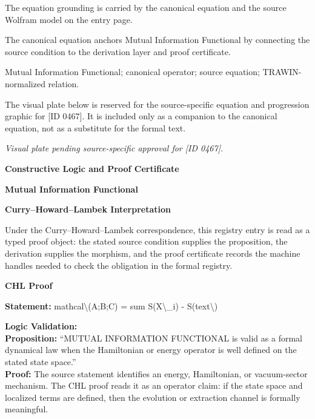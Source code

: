 The equation grounding is carried by the canonical equation and the source Wolfram model on the entry page.

The canonical equation anchors Mutual Information Functional by connecting the source condition to the derivation layer and proof certificate.

Mutual Information Functional; canonical operator; source equation; TRAWIN-normalized relation.
\endgroup

\begingroup\footnotesize\sloppy
The visual plate below is reserved for the source-specific equation and progression graphic for [ID 0467]. It is included only as a companion to the canonical equation, not as a substitute for the formal text.
\par\endgroup
\begingroup\footnotesize\itshape
Visual plate pending source-specific approval for [ID 0467].
\par\endgroup

\clearpage
\begingroup\tzpsupportsetup
\noindent\textbf{\fontsize{10.8pt}{12.8pt}\selectfont [ID 0467] Constructive Logic and Proof Certificate}\par
\noindent\textbf{\fontsize{10pt}{12pt}\selectfont Mutual Information Functional}\par
\vspace{0.45em}
\begingroup
\footnotesize
\setlength{\parskip}{0.22em}
\setlength{\parindent}{0pt}
\noindent\textbf{Curry--Howard--Lambek Interpretation}\par
Under the Curry--Howard--Lambek correspondence, this registry entry is read as a typed proof
object: the stated source condition supplies the proposition, the derivation supplies the
morphism, and the proof certificate records the machine handles needed to check the obligation
in the formal registry.

\vspace{0.45em}
\noindent\textbf{CHL Proof}\par
\textbf{Statement:} mathcal\textbackslash{}(A;B;C) = sum S(X\textbackslash{}\_i) - S(text\textbackslash{})

\textbf{Logic Validation:}\\
\textbf{Proposition:} ``MUTUAL INFORMATION FUNCTIONAL is valid as a formal dynamical law when the Hamiltonian or
energy operator is well defined on the stated state space.''\\
\textbf{Proof:} The source statement identifies an energy, Hamiltonian, or vacuum-sector mechanism. The
CHL proof reads it as an operator claim: if the state space and localized terms are
defined, then the evolution or extraction channel is formally meaningful.

